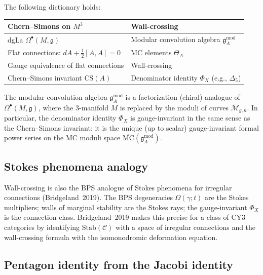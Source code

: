\begin{proposition}
\label{prop:phys-wc-cs}
The following dictionary holds:
\begin{center}
\renewcommand{\arraystretch}{1.4}
\begin{tabular}{ll}
\hline
\textbf{Chern--Simons on $M^3$} & \textbf{Wall-crossing} \\
\hline
dgLa $\Omega^\bullet(M, \mathfrak{g})$ & Modular convolution algebra $\mathfrak{g}^{\mathrm{mod}}_A$ \\
Flat connections: $dA + \tfrac{1}{2}[A,A]=0$ & MC elements $\Theta_A$ \\
Gauge equivalence of flat connections & Wall-crossing \\
Chern--Simons invariant $\mathrm{CS}(A)$ & Denominator identity $\Phi_X$ (e.g., $\Delta_5$) \\
\hline
\end{tabular}
\end{center}
The modular convolution algebra $\mathfrak{g}^{\mathrm{mod}}_A$ is a factorization (chiral) analogue of $\Omega^\bullet(M, \mathfrak{g})$, where the 3-manifold $M$ is replaced by the moduli of curves $\overline{\mathcal{M}}_{g,n}$. In particular, the denominator identity $\Phi_X$ is gauge-invariant in the same sense as the Chern--Simons invariant: it is the unique (up to scalar) gauge-invariant formal power series on the MC moduli space $\overline{\mathrm{MC}}(\mathfrak{g}^{\mathrm{mod}}_A)$.
\end{proposition}

\subsection{Stokes phenomena analogy}
\label{ssec:phys-stokes}

Wall-crossing is also the BPS analogue of Stokes phenomena for irregular connections (Bridgeland~2019). The BPS degeneracies $\Omega(\gamma; t)$ are the Stokes multipliers; walls of marginal stability are the Stokes rays; the gauge-invariant $\Phi_X$ is the connection class. Bridgeland~2019 makes this precise for a class of CY3 categories by identifying $\mathrm{Stab}(\mathcal{C})$ with a space of irregular connections and the wall-crossing formula with the isomonodromic deformation equation.

\subsection{Pentagon identity from the Jacobi identity}
\label{ssec:phys-pentagon}

